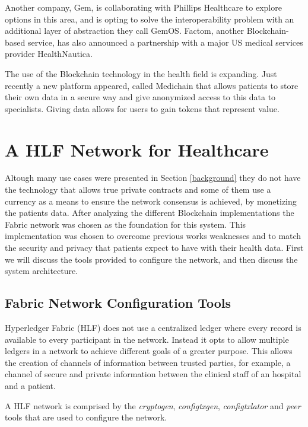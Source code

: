 \documentclass[]{llncs}
\begin{document}
Another company, Gem, is collaborating with Phillips Healthcare to explore options 
in this area, and is opting to solve the interoperability problem with an additional 
layer of abstraction they call GemOS. 
Factom, another Blockchain-based service, has also announced a partnership with a 
major US medical services provider HealthNautica.\cite{BlockchainCompHealth2017,FactomPartnership2017}

The use of the Blockchain technology in the health field is expanding. Just recently a new 
platform appeared, called Medichain that allows patients to store their own data in a secure 
way and give anonymized access to this data to specialists. Giving data allows for users to gain 
tokens that represent value. \cite{MediChain2018}


\section{A HLF Network for Healthcare} \label{HLFHealthcare}
Altough many use cases were presented in Section \ref{background} they do not have the technology 
that allows true private contracts and some of them use a currency as a means to ensure the network consensus is achieved, by monetizing the patients data.
After analyzing the different Blockchain implementations the Fabric network was 
chosen as the foundation for this system. This implementation was chosen to overcome previous works 
weaknesses and to match the security and privacy that patients expect to have with their health data.
First we will discuss the tools provided to configure the network, and then discuss 
the system architecture.

\subsection{Fabric Network Configuration Tools}

Hyperledger Fabric (HLF) does not use a centralized ledger where every record is available to every 
participant in the network. 
Instead it opts to allow multiple ledgers in a network to achieve different goals of a greater purpose. 
This allows the creation of channels of information between trusted parties, 
for example, a channel of secure and private information between the clinical staff of an hospital and a patient.

A HLF network is comprised by the \textit{cryptogen}, \textit{configtxgen}, 
\textit{configtxlator} and \textit{peer} tools that are used to configure the network.
\end{document}
